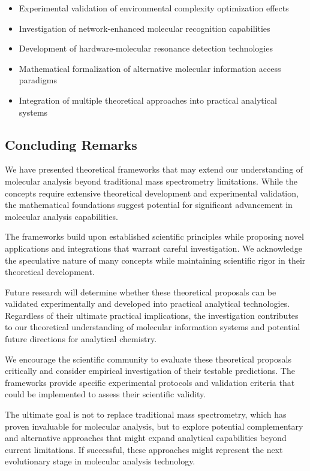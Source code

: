 \documentclass[11pt,a4paper]{article}
\theoremstyle{remark}
\begin{document}
\begin{itemize}
\item Experimental validation of environmental complexity optimization effects
\item Investigation of network-enhanced molecular recognition capabilities
\item Development of hardware-molecular resonance detection technologies
\item Mathematical formalization of alternative molecular information access paradigms
\item Integration of multiple theoretical approaches into practical analytical systems
\end{itemize}

\subsection{Concluding Remarks}

We have presented theoretical frameworks that may extend our understanding of molecular analysis beyond traditional mass spectrometry limitations. While the concepts require extensive theoretical development and experimental validation, the mathematical foundations suggest potential for significant advancement in molecular analysis capabilities.

The frameworks build upon established scientific principles while proposing novel applications and integrations that warrant careful investigation. We acknowledge the speculative nature of many concepts while maintaining scientific rigor in their theoretical development.

Future research will determine whether these theoretical proposals can be validated experimentally and developed into practical analytical technologies. Regardless of their ultimate practical implications, the investigation contributes to our theoretical understanding of molecular information systems and potential future directions for analytical chemistry.

We encourage the scientific community to evaluate these theoretical proposals critically and consider empirical investigation of their testable predictions. The frameworks provide specific experimental protocols and validation criteria that could be implemented to assess their scientific validity.

The ultimate goal is not to replace traditional mass spectrometry, which has proven invaluable for molecular analysis, but to explore potential complementary and alternative approaches that might expand analytical capabilities beyond current limitations. If successful, these approaches might represent the next evolutionary stage in molecular analysis technology.
\end{document}
